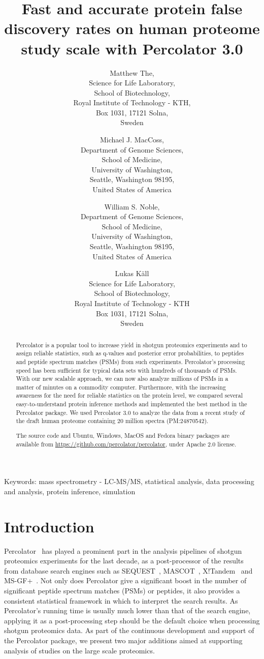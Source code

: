 \documentclass{article}
\title{Fast and accurate protein false discovery rates on human
proteome study scale with Percolator 3.0}
\author{Matthew The,\\
Science for Life Laboratory,\\
School of Biotechnology,\\
Royal Institute of Technology - KTH,\\
Box 1031, 17121 Solna,\\ Sweden
\and 
Michael J. MacCoss,\\
Department of Genome Sciences,\\
School of Medicine,\\
University of Washington,\\
Seattle, Washington 98195,\\ United States of America
\and 
William S. Noble,\\
Department of Genome Sciences,\\
School of Medicine,\\
University of Washington,\\
Seattle, Washington 98195,\\ United States of America
\and
Lukas K\"{a}ll\\
Science for Life Laboratory,\\ School of Biotechnology,\\
Royal Institute of Technology - KTH\\ 
Box 1031, 17121 Solna,\\ Sweden}
\begin{document}
\maketitle

\doublespacing

Keywords: mass spectrometry - LC-MS/MS, statistical analysis, 
data processing and analysis, protein inference, simulation


\newpage

\begin{abstract} 

Percolator is a popular tool to increase yield in shotgun proteomics
experiments and to assign reliable statistics, such as q-values and
posterior error probabilities, to peptides and peptide spectrum
matches (PSMs) from such experiments. Percolator's processing speed
has been sufficient for typical data sets with hundreds of thousands
of PSMs. With our new scalable approach, we can now also analyze
millions of PSMs in a matter of minutes on a commodity computer.
Furthermore, with the increasing awareness for the need for reliable
statistics on the protein level, we compared several
easy-to-understand protein inference methods and implemented the best
method in the Percolator package. We used Percolator 3.0 to analyze
the data from a recent study of the draft human proteome containing 20
million spectra (PM:24870542).

The source code and Ubuntu, Windows, MacOS and Fedora binary packages
are available from \url{https://github.com/percolator/percolator},
under Apache 2.0 license.
\end{abstract}

\newpage

\section*{Introduction}

Percolator~\cite{kall2007} has played a prominent part in the analysis
pipelines of shotgun proteomics experiments for the last decade, as a
post-processor of the results from database search engines such as
SEQUEST~\cite{eng1994}, MASCOT~\cite{cottrell1999},
X!Tandem~\cite{craig2004tandem} and MS-GF+~\cite{kim2008}. Not only
does Percolator give a significant boost in the number of significant
peptide spectrum matches (PSMs) or peptides, it also provides a
consistent statistical framework in which to interpret the search
results. As Percolator's running time is usually much lower than that
of the search engine, applying it as a post-processing step should be
the default choice when processing shotgun proteomics data. As part of
the continuous development and support of the Percolator package, we
present two major additions aimed at supporting analysis of studies on
the large scale proteomics.
\end{document}
